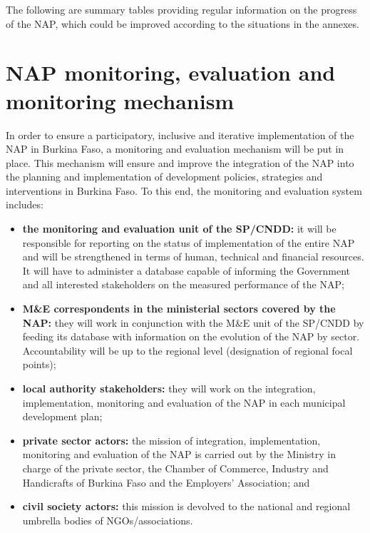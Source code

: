 \documentclass[
]{book}
\begin{document}
The following are summary tables providing regular information on the progress of the NAP, which could be improved according to the situations in the annexes.

\section{NAP monitoring, evaluation and monitoring mechanism}\label{nap-monitoring-evaluation-and-monitoring-mechanism}

In order to ensure a participatory, inclusive and iterative implementation of the NAP in Burkina Faso, a monitoring and evaluation mechanism will be put in place. This mechanism will ensure and improve the integration of the NAP into the planning and implementation of development policies, strategies and interventions in Burkina Faso. To this end, the monitoring and evaluation system includes:

\begin{itemize}
\item
  \textbf{the monitoring and evaluation unit of the SP/CNDD:} it will be responsible for reporting on the status of implementation of the entire NAP and will be strengthened in terms of human, technical and financial resources. It will have to administer a database capable of informing the Government and all interested stakeholders on the measured performance of the NAP;
\item
  \textbf{M\&E correspondents in the ministerial sectors covered by the NAP:} they will work in conjunction with the M\&E unit of the SP/CNDD by feeding its database with information on the evolution of the NAP by sector. Accountability will be up to the regional level (designation of regional focal points);
\item
  \textbf{local authority stakeholders:} they will work on the integration, implementation, monitoring and evaluation of the NAP in each municipal development plan;
\item
  \textbf{private sector actors:} the mission of integration, implementation, monitoring and evaluation of the NAP is carried out by the Ministry in charge of the private sector, the Chamber of Commerce, Industry and Handicrafts of Burkina Faso and the Employers' Association; and
\item
  \textbf{civil society actors:} this mission is devolved to the national and regional umbrella bodies of NGOs/associations.
\end{itemize}
\end{document}
